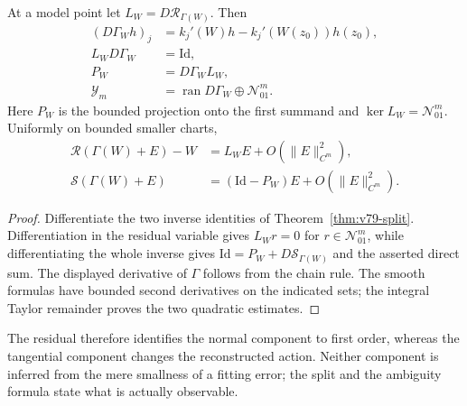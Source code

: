 \begin{proposition}
\label{prop:v79-tangent}
At a model point let $L_W=D\mathcal R_{\Gamma(W)}$.  Then
\begin{align*}
 (D\Gamma_W h)_j
   &=k_j'(W)h-k_j'(W(z_0))h(z_0),\\
 L_WD\Gamma_W&=\mathrm{Id},\\
 P_W&=D\Gamma_WL_W,\\
 \mathcal Y_m&=\operatorname{ran}D\Gamma_W\oplus\mathcal N_{01}^m.
\end{align*}
Here $P_W$ is the bounded projection onto the first summand and
$\ker L_W=\mathcal N_{01}^m$.  Uniformly on bounded smaller charts,
\begin{align}
 \mathcal R(\Gamma(W)+E)-W&=L_WE+O(\|E\|_{C^m}^2),
       \label{eq:v79-tangent-bias}\\
 \mathcal S(\Gamma(W)+E)&=(\mathrm{Id}-P_W)E
                                      +O(\|E\|_{C^m}^2).
       \label{eq:v79-normal-bias}
\end{align}
\end{proposition}
\begin{proof}
Differentiate the two inverse identities of Theorem~\ref{thm:v79-split}.
Differentiation in the residual variable gives $L_Wr=0$ for
$r\in\mathcal N_{01}^m$, while differentiating the whole inverse gives
$\mathrm{Id}=P_W+D\mathcal S_{\Gamma(W)}$ and the asserted direct sum.
The displayed derivative of $\Gamma$ follows from the chain rule.
The smooth formulas have bounded second derivatives on the indicated
sets; the integral Taylor remainder proves the two quadratic estimates.
\end{proof}

The residual therefore identifies the normal component to first order,
whereas the tangential component changes the reconstructed action.
Neither component is inferred from the mere smallness of a fitting
error; the split and the ambiguity formula state what is actually
observable.
